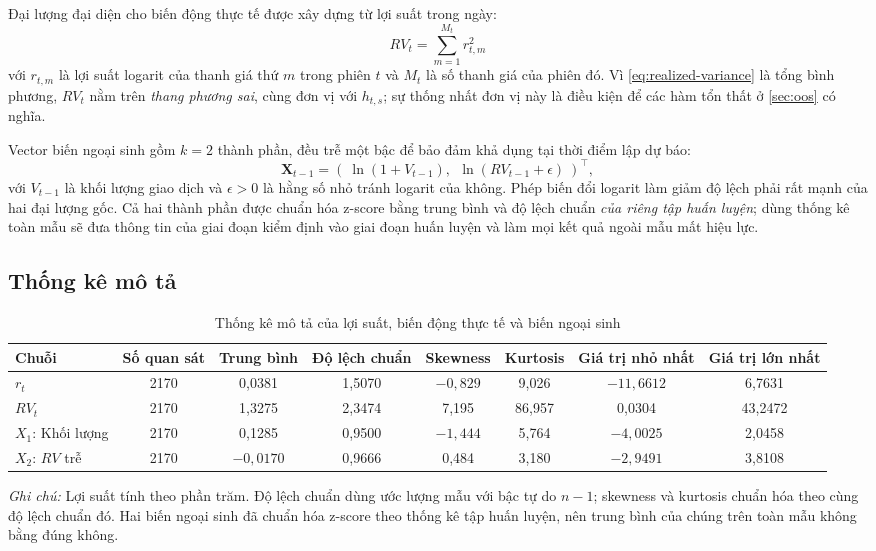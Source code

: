 \documentclass[12pt,a4paper]{article}
\numberwithin{equation}{section}
\theoremstyle{definition}
\newcommand{\Xvec}{\symbf{X}}
\begin{document}
	Đại lượng đại diện cho biến động thực tế được xây dựng từ lợi suất trong ngày:
	\begin{equation}
		RV_t=\sum_{m=1}^{M_t} r_{t,m}^{2}
		\label{eq:realized-variance}
	\end{equation}
	với $r_{t,m}$ là lợi suất logarit của thanh giá thứ $m$ trong phiên $t$ và $M_t$ là số
	thanh giá của phiên đó. Vì \eqref{eq:realized-variance} là tổng bình phương, $RV_t$ nằm
	trên \emph{thang phương sai}, cùng đơn vị với $h_{t,s}$; sự thống nhất đơn vị này là điều
	kiện để các hàm tổn thất ở \cref{sec:oos} có nghĩa.
	
	Vector biến ngoại sinh gồm $k=2$ thành phần, đều trễ một bậc để bảo đảm khả dụng tại thời
	điểm lập dự báo:
	\begin{equation}
		\Xvec_{t-1}=\left(\ \ln\!\left(1+V_{t-1}\right),\ \ \ln\!\left(RV_{t-1}+\epsilon\right)\ \right)^{\!\top},
		\label{eq:exog}
	\end{equation}
	với $V_{t-1}$ là khối lượng giao dịch và $\epsilon>0$ là hằng số nhỏ tránh logarit của
	không. Phép biến đổi logarit làm giảm độ lệch phải rất mạnh của hai đại lượng gốc. Cả hai
	thành phần được chuẩn hóa z-score bằng trung bình và độ lệch chuẩn \emph{của riêng tập
		huấn luyện}; dùng thống kê toàn mẫu sẽ đưa thông tin của giai đoạn kiểm định vào giai
	đoạn huấn luyện và làm mọi kết quả ngoài mẫu mất hiệu lực.
	\subsection{Thống kê mô tả}\label{subsec:descriptive}
	
	\begin{table}[H]
		\centering\footnotesize
		\setlength{\tabcolsep}{5pt}
		\caption{Thống kê mô tả của lợi suất, biến động thực tế và biến ngoại sinh}
		\label{tab:descriptive}
	\begin{tabularx}{\textwidth}{l C C C C C C C}
		\toprule
		\textbf{Chuỗi} & \textbf{Số quan sát} & \textbf{Trung bình} & \textbf{Độ lệch chuẩn} & \textbf{Skewness} & \textbf{Kurtosis} & \textbf{Giá trị nhỏ nhất} & \textbf{Giá trị lớn nhất} \\
		\midrule
		$r_t$ & 2170 & 0{,}0381 & 1{,}5070 & $-0{,}829$ & 9{,}026 & $-11{,}6612$ & 6{,}7631 \\
		\addlinespace[0.2em]
		$RV_t$ & 2170 & 1{,}3275 & 2{,}3474 & 7{,}195 & 86{,}957 & 0{,}0304 & 43{,}2472 \\
		\addlinespace[0.2em]
		$X_1$: Khối lượng & 2170 & 0{,}1285 & 0{,}9500 & $-1{,}444$ & 5{,}764 & $-4{,}0025$ & 2{,}0458 \\
		$X_2$: $RV$ trễ & 2170 & $-0{,}0170$ & 0{,}9666 & 0{,}484 & 3{,}180 & $-2{,}9491$ & 3{,}8108 \\
		\bottomrule
	\end{tabularx}
		\raggedright\footnotesize
		\textit{Ghi chú:} Lợi suất tính theo phần trăm. Độ lệch chuẩn dùng ước lượng mẫu với bậc
		tự do $n-1$; skewness và kurtosis chuẩn hóa theo cùng độ lệch chuẩn đó. Hai biến
		ngoại sinh đã chuẩn hóa z-score theo thống kê tập huấn luyện, nên trung bình của chúng
		trên toàn mẫu không bằng đúng không.
	\end{table}
	
\end{document}
